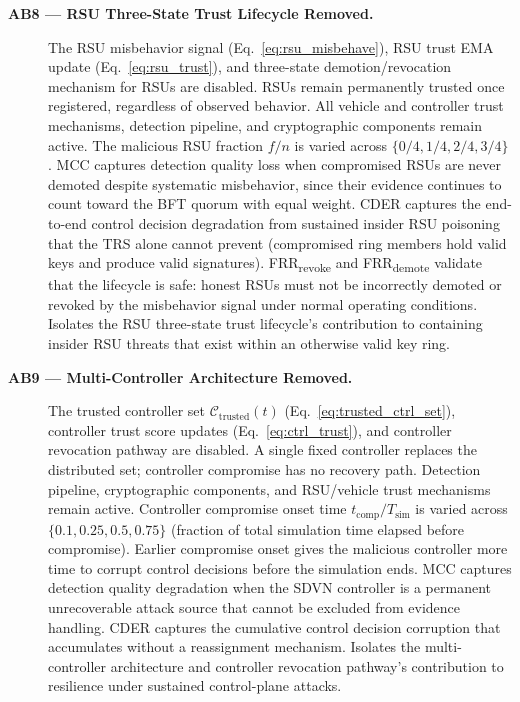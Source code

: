\documentclass[12pt, a4paper]{report}
\begin{document}
\begin{description}
\item[\textbf{AB8 --- RSU Three-State Trust Lifecycle Removed.}]
The RSU misbehavior signal (Eq.~\ref{eq:rsu_misbehave}), RSU
trust EMA update (Eq.~\ref{eq:rsu_trust}), and three-state
demotion/revocation mechanism for RSUs are disabled. RSUs remain
permanently trusted once registered, regardless of observed
behavior. All vehicle and controller trust mechanisms, detection
pipeline, and cryptographic components remain active. The malicious
RSU fraction $f/n$ is varied across $\{0/4, 1/4, 2/4, 3/4\}$.
MCC captures detection quality loss when compromised RSUs are
never demoted despite systematic misbehavior, since their evidence
continues to count toward the BFT quorum with equal weight.
CDER captures the end-to-end control decision degradation from
sustained insider RSU poisoning that the TRS alone cannot prevent
(compromised ring members hold valid keys and produce valid
signatures). FRR\textsubscript{revoke} and
FRR\textsubscript{demote} validate that the lifecycle is safe:
honest RSUs must not be incorrectly demoted or revoked by the
misbehavior signal under normal operating conditions. Isolates
the RSU three-state trust lifecycle's contribution to containing
insider RSU threats that exist within an otherwise valid key ring.

\item[\textbf{AB9 --- Multi-Controller Architecture Removed.}]
The trusted controller set $\mathcal{C}_{\mathrm{trusted}}(t)$
(Eq.~\ref{eq:trusted_ctrl_set}), controller trust score updates
(Eq.~\ref{eq:ctrl_trust}), and controller revocation pathway are
disabled. A single fixed controller replaces the distributed set;
controller compromise has no recovery path. Detection pipeline,
cryptographic components, and RSU/vehicle trust mechanisms remain
active. Controller compromise onset time
$t_{\mathrm{comp}}/T_{\mathrm{sim}}$ is varied across $\{0.1,
0.25, 0.5, 0.75\}$ (fraction of total simulation time elapsed
before compromise). Earlier compromise onset gives the malicious
controller more time to corrupt control decisions before the
simulation ends. MCC captures detection quality degradation when
the SDVN controller is a permanent unrecoverable attack source
that cannot be excluded from evidence handling. CDER captures the
cumulative control decision corruption that accumulates without a
reassignment mechanism. Isolates the multi-controller architecture
and controller revocation pathway's contribution to resilience
under sustained control-plane attacks.


\end{description}
\end{document}

